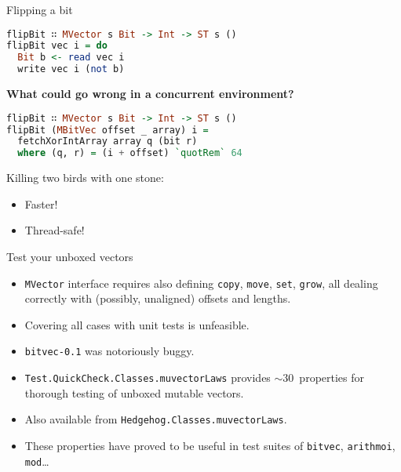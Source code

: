 \documentclass[handout]{beamer}
\begin{document}
\begin{frame}[fragile]{Flipping a bit}

\begin{lstlisting}[language=Haskell]
flipBit ∷ MVector s Bit -> Int -> ST s ()
flipBit vec i = do
  Bit b <- read vec i
  write vec i (not b)
\end{lstlisting}

\pause

\centerline{\bf What could go wrong in a concurrent environment?}

\pause

\bigskip
\bigskip

\begin{lstlisting}[language=Haskell]
flipBit ∷ MVector s Bit -> Int -> ST s ()
flipBit (MBitVec offset _ array) i =
  fetchXorIntArray array q (bit r)
  where (q, r) = (i + offset) `quotRem` 64
\end{lstlisting}

\pause

\medskip

Killing two birds with one stone:

\begin{itemize}[<+->]
\item Faster!
\item Thread-safe!
\end{itemize}

\end{frame}

\begin{frame}{Test your unboxed vectors}

\begin{itemize}[<+->]
\item {\tt MVector} interface requires also defining
      {\tt copy}, {\tt move}, {\tt set}, {\tt grow},
      all dealing correctly with (possibly, unaligned) offsets and lengths.
\item Covering all cases with unit tests is unfeasible.
\item {\tt bitvec-0.1} was notoriously buggy.
\item {\tt Test.QuickCheck.Classes.muvectorLaws} provides $\sim30$~properties
      for thorough testing of unboxed mutable vectors.
\item Also available from {\tt Hedgehog.Classes.muvectorLaws}.
\item These properties have proved to be useful in test suites
      of {\tt bitvec}, {\tt arithmoi}, {\tt mod}\dots
\end{itemize}

\end{frame}
\end{document}
